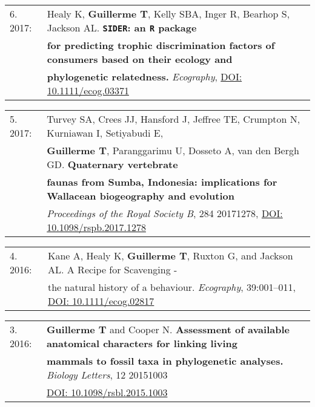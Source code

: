 \documentclass[10pt,a4paper]{article}
\begin{document}
{\bigskip

\begin{tabular}{ll}
6. 2017: & Healy K, \textbf{Guillerme T}, Kelly SBA, Inger R, Bearhop S, Jackson AL. \textbf{\texttt{SIDER}: an \texttt{R} package}\\
      & \textbf{for predicting trophic discrimination factors of consumers based on their ecology and}\\
      & \textbf{phylogenetic relatedness.} \textit{Ecography}, \href{http://onlinelibrary.wiley.com/doi/10.1111/ecog.03371/full}{DOI: 10.1111/ecog.03371}\\
\end{tabular}

\bigskip

\begin{tabular}{ll}
5. 2017: & Turvey SA, Crees JJ, Hansford J, Jeffree TE, Crumpton N, Kurniawan I, Setiyabudi E,\\
      & \textbf{Guillerme T}, Paranggarimu U, Dosseto A, van den Bergh GD. \textbf{Quaternary vertebrate}\\
      & \textbf{faunas from Sumba, Indonesia: implications for Wallacean biogeography and evolution} \\
      & \textit{Proceedings of the Royal Society B}, 284 20171278, \href{http://rspb.royalsocietypublishing.org/content/284/1861/20171278}{DOI: 10.1098/rspb.2017.1278}\\ %
\end{tabular}

\bigskip

\begin{tabular}{ll}
4. 2016: & Kane A, Healy K, \textbf{Guillerme T}, Ruxton G, and Jackson AL. A Recipe for Scavenging -\\
      & the natural history of a behaviour. \textit{Ecography}, 39:001–011, \href{http://onlinelibrary.wiley.com/doi/10.1111/ecog.02817/abstract}{DOI: 10.1111/ecog.02817}\\ %
\end{tabular}

\bigskip

\begin{tabular}{ll}
3. 2016: &\textbf{Guillerme T} and Cooper N. \textbf{Assessment of available anatomical characters for linking living}\\
      & \textbf{mammals to fossil taxa in phylogenetic analyses.} \textit{Biology Letters}, 12 20151003\\
      & \href{http://rsbl.royalsocietypublishing.org/content/12/5/20151003}{DOI: 10.1098/rsbl.2015.1003}\\ %
\end{tabular}

}
\end{document}
